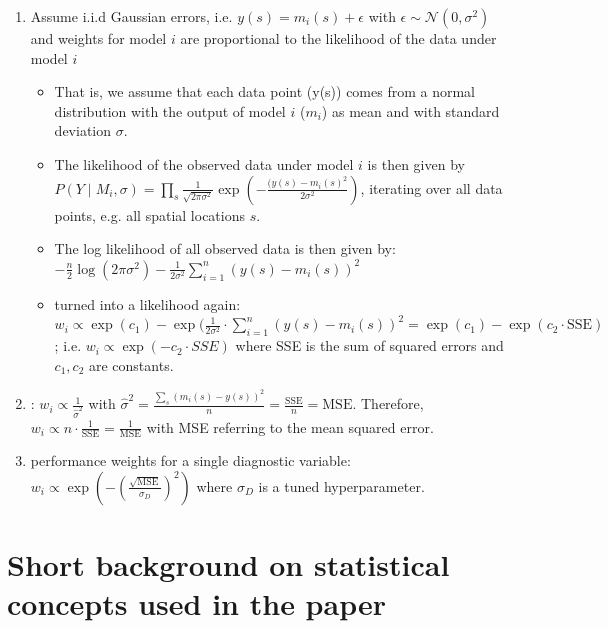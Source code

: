 \begin{enumerate}
    \item Assume i.i.d Gaussian errors, i.e. $y(s) = m_i(s) + \epsilon$ with $\epsilon \sim \mathcal{N}(0,\sigma^2)$ and weights for model $i$ are proportional to the likelihood of the data under model $i$
    \begin{itemize}
        \item That is, we assume that each data point (y(s)) comes from a normal distribution with the output of model $i$ ($m_i$) as mean and with standard deviation $\sigma$.
        \item The likelihood of the observed data under model $i$ is then given by $P(Y\mid M_i, \sigma) = \prod_{s} {\frac {1}{\sqrt {2\pi \sigma ^{2}}}}\exp {\left(-{\frac {(y(s) - m_i(s)^{2}}{2\sigma ^{2}}}\right)}$, iterating over all data points, e.g. all spatial locations $s$.
        \item The log likelihood of all observed data is then given by: $-{\frac {n}{2}}\log(2\pi \sigma ^{2})-{\frac {1}{2\sigma ^{2}}}\sum _{i=1}^{n}\left(y(s)-m_i(s) \right)^{2}$
        \item turned into a likelihood again: $w_i \propto \exp(c_1) - \exp(\frac{1}{2\sigma^2} \cdot \sum _{i=1}^{n}\left(y(s)-m_i(s) \right)^{2} = \exp(c_1) - \exp(c_2 \cdot \textrm{SSE})$; i.e. $w_i\propto \exp(-c_2\cdot SSE)$ where SSE is the sum of squared errors and $c_1, c_2$ are constants.
    \end{itemize}

\item \citet{sierraInformationtheoreticApproachObtain2025}: $w_i \propto \frac{1}{\hat{\sigma}^2}$ with $\hat{\sigma}^2 = \frac{\sum_{s} (m_i(s) - y(s))^2}{n} = \frac{\textrm{SSE}}{n} = \textrm{MSE}$. Therefore, $w_i \propto n \cdot \frac{1}{\textrm{SSE}}=\frac{1}{\textrm{MSE}}$ with MSE referring to the mean squared error.

\item \citet{brunnerReducedGlobalWarming2020} performance weights for a single diagnostic variable: $w_i \propto \exp(-(\frac{\sqrt{\textrm{MSE}}}{\sigma_D})^2)$ where $\sigma_D$ is a tuned hyperparameter. 

\end{enumerate}


\section{Short background on statistical concepts used in the paper}\label{sec:appendix-bayesian-stats}

